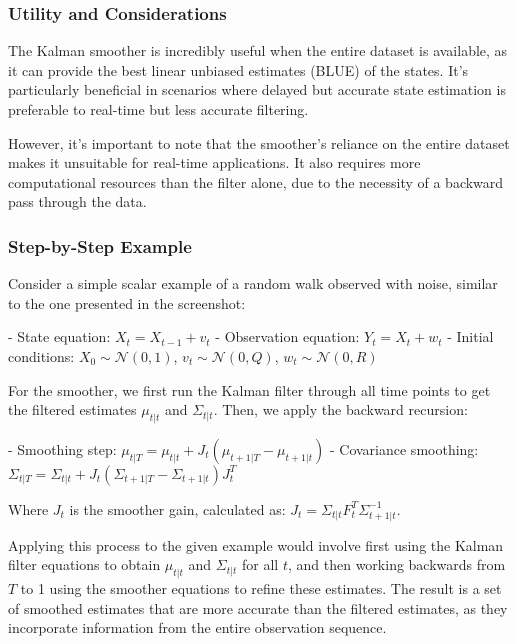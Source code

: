 \documentclass{article}
\begin{document}
\subsubsection{Utility and Considerations}
The Kalman smoother is incredibly useful when the entire dataset is available, as it can provide the best linear unbiased estimates (BLUE) of the states. It's particularly beneficial in scenarios where delayed but accurate state estimation is preferable to real-time but less accurate filtering.

However, it's important to note that the smoother's reliance on the entire dataset makes it unsuitable for real-time applications. It also requires more computational resources than the filter alone, due to the necessity of a backward pass through the data.

\subsubsection{Step-by-Step Example}
Consider a simple scalar example of a random walk observed with noise, similar to the one presented in the screenshot:

- State equation: \(X_t = X_{t-1} + v_t\)
- Observation equation: \(Y_t = X_t + w_t\)
- Initial conditions: \(X_0 \sim \mathcal{N}(0,1)\), \(v_t \sim \mathcal{N}(0,Q)\), \(w_t \sim \mathcal{N}(0,R)\)

For the smoother, we first run the Kalman filter through all time points to get the filtered estimates \(\mu_{t|t}\) and \(\Sigma_{t|t}\). Then, we apply the backward recursion:

- Smoothing step: \( \mu_{t|T} = \mu_{t|t} + J_t(\mu_{t+1|T} - \mu_{t+1|t}) \)
- Covariance smoothing: \( \Sigma_{t|T} = \Sigma_{t|t} + J_t(\Sigma_{t+1|T} - \Sigma_{t+1|t})J_t^T \)

Where \( J_t \) is the smoother gain, calculated as:
\( J_t = \Sigma_{t|t}F_{t}^T\Sigma_{t+1|t}^{-1} \).

Applying this process to the given example would involve first using the Kalman filter equations to obtain \(\mu_{t|t}\) and \(\Sigma_{t|t}\) for all \(t\), and then working backwards from \(T\) to 1 using the smoother equations to refine these estimates. The result is a set of smoothed estimates that are more accurate than the filtered estimates, as they incorporate information from the entire observation sequence.
\end{document}
